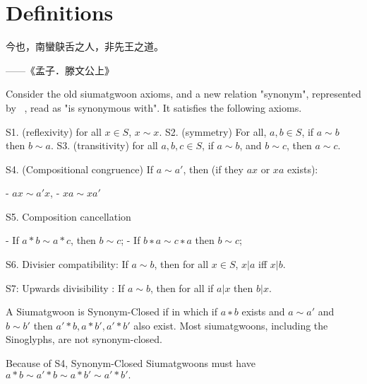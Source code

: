 \section{Definitions}

\epigraph{今也，南蠻鴃舌之人，非先王之道。}{——《孟子．滕文公上》}

Consider the old siumatgwoon axioms, and a new relation "synonym", represented by ~, read as "is synonymous with". It satisfies the following axioms.

S1. (reflexivity) for all $x\in S$, $x\sim x$.
S2. (symmetry) For all, $a,b\in S$, if $a\sim b$ then $b\sim a$.
S3. (transitivity) for all $a,b,c \in S$, if $a\sim b$, and $b \sim c$, then $a \sim c$.

S4. (Compositional congruence) If $a \sim a'$, then (if they $ax$ or $xa$ exists):

- $ax \sim a'x$,
- $xa \sim xa'$

S5. Composition cancellation

- If $a * b \sim a * c$, then $b \sim c$;
- If $b∗a\sim c∗a$ then  $b \sim c$;

S6. Divisier compatibility: If $a \sim b$, then for all $x \in S$, $x|a$ iff $x|b$.

S7: Upwards divisibility : If $a∼b$, then for all if $a|x$ then $b|x$.

A Siumatgwoon is Synonym-Closed if in which if $a∗b$  exists and $a∼a'$ and $b∼b'$ then $a'*b, a*b', a'*b'$ also exist. Most siumatgwoons, including the Sinoglyphs, are not synonym-closed. 

Because of S4, Synonym-Closed Siumatgwoons must have $a*b \sim a'*b \sim  a*b'\sim  a'*b'.$ 







